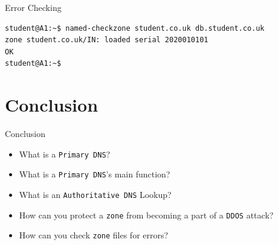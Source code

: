 \documentclass[xcolor=table]{beamer}
\begin{document}
\begin{frame}[fragile]{Error Checking}
  \begin{tcolorbox}
    \lstset{
      basicstyle=\tiny\ttfamily,
    }
    \begin{lstlisting}
student@A1:~$ named-checkzone student.co.uk db.student.co.uk
zone student.co.uk/IN: loaded serial 2020010101
OK
student@A1:~$
    \end{lstlisting}
  \end{tcolorbox}
\end{frame}

\section*{Conclusion}
\begin{frame}{Conclusion}
  \begin{itemize}
    \item What is a \texttt{Primary DNS}?
    \item What is a \texttt{Primary DNS}’s main function?
    \item What is an \texttt{Authoritative DNS} Lookup?
    \item How can you protect a \texttt{zone} from becoming a part of a \texttt{DDOS} attack?
    \item How can you check \texttt{zone} files for errors?
  \end{itemize}
\end{frame}
\end{document}
